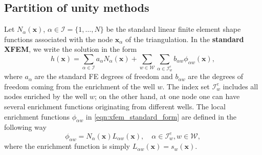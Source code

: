 \documentclass{elsarticle}
\def\vc#1{\mathbf{\boldsymbol{#1}}}     %
\newcommand{\bx}{\vc{x}}
\begin{document}
\subsection{Partition of unity methods}
\label{sec:pum_methods}
Let $N_\alpha(\bx)$, $\alpha\in\mathcal{I}=\{1,\ldots,N\}$ be the standard linear finite element shape 
functions associated with the node $\bx_\alpha$ of the triangulation. 
In the \textbf{standard XFEM}, we write the solution in the form
\begin{equation} \label{eqn:xfem_standard_form}
  h(\bx) = \sum_{\alpha\in\mathcal{I}}a_\alpha N_\alpha(\bx)
    + \sum_{w\in\mathcal{W}} \sum_{\alpha\in\mathcal{I}^e_w} b_{\alpha w} \phi_{\alpha w}(\bx),
\end{equation}
where $a_\alpha$ are the standard FE degrees of freedom and $b_{\alpha w}$ are the degrees of freedom coming from
the enrichment of the well $w$. The index set $\mathcal{I}^e_w$ includes all nodes enriched by the well $w$; on the other hand, 
at one node one can have several enrichment functions originating from different wells.
The local enrichment functions $\phi_{\alpha w}$ in \eqref{eqn:xfem_standard_form} are defined
in the following way
\begin{equation} \label{eqn:xfem_enrich}
    \phi_{\alpha w} = N_\alpha(\bx)L_{\alpha w}(\bx), \quad \alpha\in\mathcal{I}^e_w, w\in\mathcal{W},
\end{equation}
where the enrichment function is simply $L_{\alpha w}(\bx) = s_w(\bx)$.
\end{document}
